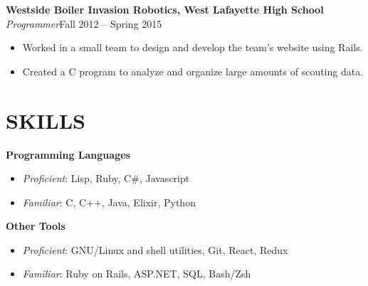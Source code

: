 \documentclass[line,margin]{res}
\begin{document}
\begin{resume}
  {\bf\rmfamily  Westside Boiler Invasion Robotics, West Lafayette High School}\\
  \emph{Programmer}\hfill Fall 2012 -- Spring 2015
  \begin{itemize}  \itemsep -2pt %
  \item Worked in a small team to design and develop the team's website using Rails.
  \item Created a C program to analyze and organize large amounts of scouting data.
  \end{itemize}





  \section{SKILLS}
  {\bf\rmfamily Programming Languages}
  \begin{itemize} \itemsep -2pt
  \item \emph{Proficient}: Lisp, Ruby, C\#, Javascript
  \item \emph{Familiar}: C, C++, Java, Elixir, Python
  \end{itemize}

  {\bf\rmfamily Other Tools}
  \begin{itemize} \itemsep -2pt
  \item \emph{Proficient}: GNU/Linux and shell utilities, Git, React, Redux%
  \item \emph{Familiar}: Ruby on Rails, ASP.NET, SQL, Bash/Zsh
  \end{itemize}


\end{resume}
\end{document}
